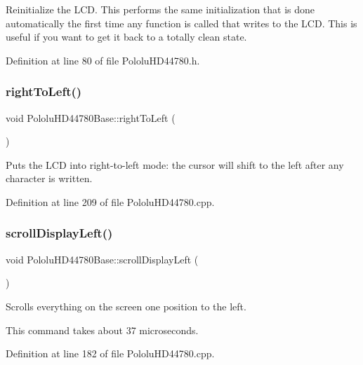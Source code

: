 Reinitialize the L\+CD. This performs the same initialization that is done automatically the first time any function is called that writes to the L\+CD. This is useful if you want to get it back to a totally clean state. 

Definition at line 80 of file Pololu\+H\+D44780.\+h.

\mbox{\label{class_pololu_h_d44780_base_aa3f8d4ba18feb9aa0f0a2fef3c6c2b37}} 
\subsubsection{\texorpdfstring{right\+To\+Left()}{rightToLeft()}}
{\footnotesize\ttfamily void Pololu\+H\+D44780\+Base\+::right\+To\+Left (\begin{DoxyParamCaption}{ }\end{DoxyParamCaption})\hspace{0.3cm}{\ttfamily [inherited]}}

Puts the L\+CD into right-\/to-\/left mode\+: the cursor will shift to the left after any character is written. 

Definition at line 209 of file Pololu\+H\+D44780.\+cpp.

\mbox{\label{class_pololu_h_d44780_base_aada34a47663585f60b70e1d6f936f6d3}} 
\subsubsection{\texorpdfstring{scroll\+Display\+Left()}{scrollDisplayLeft()}}
{\footnotesize\ttfamily void Pololu\+H\+D44780\+Base\+::scroll\+Display\+Left (\begin{DoxyParamCaption}{ }\end{DoxyParamCaption})\hspace{0.3cm}{\ttfamily [inherited]}}

Scrolls everything on the screen one position to the left.

This command takes about 37 microseconds. 

Definition at line 182 of file Pololu\+H\+D44780.\+cpp.

